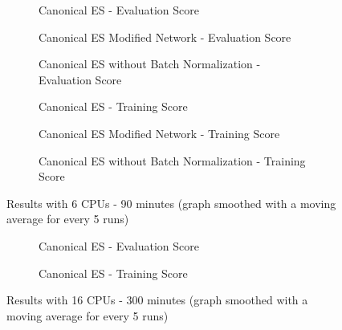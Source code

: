 \documentclass[10pt]{article} %
\begin{document}
\begin{figure}[ht]
\captionsetup{justification=centering}
\begin{subfigure}[t]{.32\textwidth}
		\centering
		
		\caption{Canonical ES - Evaluation Score}
		\label{fig:canonical-eval}
\end{subfigure}
\begin{subfigure}[t]{.32\textwidth}
		\centering
		
		\caption{Canonical ES Modified Network - Evaluation Score}
		\label{fig:canonical-modified-eval}
\end{subfigure}
\begin{subfigure}[t]{.32\textwidth}
		\centering
		
		\caption{Canonical ES without Batch Normalization - Evaluation Score}
		\label{fig:canonical-without-bn-eval}
\end{subfigure}

\begin{subfigure}[t]{.32\textwidth}
		\centering
		
		\caption{Canonical ES - Training Score}
		\label{fig:canonical-train}
\end{subfigure}
\begin{subfigure}[t]{.32\textwidth}
		\centering
		
		\caption{Canonical ES Modified Network - Training Score}
		\label{fig:canonical-modified-train}
\end{subfigure}
\begin{subfigure}[t]{.32\textwidth}
		\centering
		
		\caption{Canonical ES without Batch Normalization - Training Score}
		\label{fig:canonical-without-bn-train}
\end{subfigure}
\caption{Results with 6 CPUs - 90 minutes (graph smoothed with a moving average for every 5 runs)}
\label{fig:results-90}
\end{figure}

\begin{figure}[ht]
\captionsetup{justification=centering}
\begin{subfigure}[t]{.49\textwidth}
		\centering
		
		\caption{Canonical ES - Evaluation Score}
		\label{fig:canonical-long-run-eval}
\end{subfigure}
\begin{subfigure}[t]{.49\textwidth}
		\centering
		
		\caption{Canonical ES - Training Score}
		\label{fig:canonical-long-run-train}
\end{subfigure}

\caption{Results with 16 CPUs - 300 minutes (graph smoothed with a moving average for every 5 runs)}
\label{fig:results-300}
\end{figure}
\end{document}
